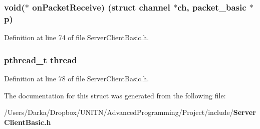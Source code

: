 \subsubsection[{on\+Packet\+Receive}]{\setlength{\rightskip}{0pt plus 5cm}void($\ast$ on\+Packet\+Receive) (struct {\bf channel} $\ast$ch, {\bf packet\+\_\+basic} $\ast$p)}\label{structchannel_a9c3a5bafc8b99be94847f407eb511642}


Definition at line 74 of file Server\+Client\+Basic.\+h.

\subsubsection[{thread}]{\setlength{\rightskip}{0pt plus 5cm}pthread\+\_\+t thread}\label{structchannel_a01f75a9ad916f63a94e06a27635ba278}


Definition at line 78 of file Server\+Client\+Basic.\+h.



The documentation for this struct was generated from the following file\+:\begin{DoxyCompactItemize}
\item 
/\+Users/\+Darka/\+Dropbox/\+U\+N\+I\+T\+N/\+Advanced\+Programming/\+Project/include/{\bf Server\+Client\+Basic.\+h}\end{DoxyCompactItemize}
